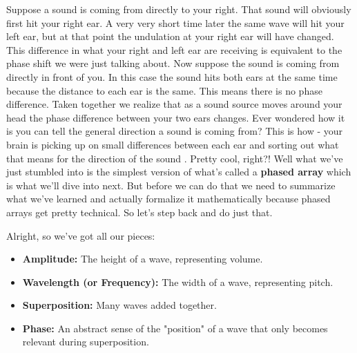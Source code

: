 \documentclass[10pt,a4paper]{article}
\begin{document}
Suppose a sound is coming from directly to your right. That sound will obviously first hit your right ear. A very very short time later the same wave will hit your left ear, but at that point the undulation at your right ear will have changed. This difference in what your right and left ear are receiving is equivalent to the phase shift we were just talking about. Now suppose the sound is coming from directly in front of you. In this case the sound hits both ears at the same time because the distance to each ear is the same. This means there is no phase difference. Taken together we realize that as a sound source moves around your head the phase difference between your two ears changes. Ever wondered how it is you can tell the general direction a sound is coming from? This is how - your brain is picking up on small differences between each ear and sorting out what that means for the direction of the sound \cite{wikilocalization}. Pretty cool, right?! Well what we've just stumbled into is the simplest version of what's called a \textbf{phased array} which is what we'll dive into next. But before we can do that we need to summarize what we've learned and actually formalize it mathematically because phased arrays get pretty technical. So let's step back and do just that.

Alright, so we've got all our pieces:
\begin{itemize}
\item \textbf{Amplitude:} The height of a wave, representing volume.
\item \textbf{Wavelength (or Frequency):} The width of a wave, representing pitch.
\item \textbf{Superposition:} Many waves added together.
\item \textbf{Phase:} An abstract sense of the "position" of a wave that only becomes relevant during superposition.
\end{itemize}
\end{document}
